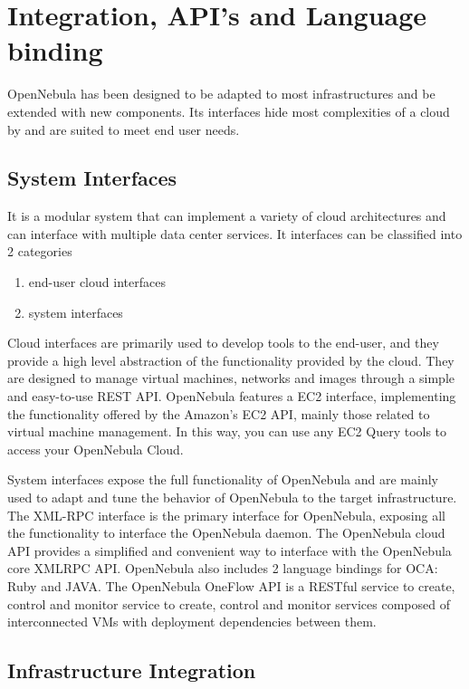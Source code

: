 \documentclass[9pt,twocolumn,twoside]{../../styles/osajnl}
\begin{document}
\section{Integration, API's and Language binding}

OpenNebula has been designed to be adapted to most 
infrastructures and be extended with new components. Its 
interfaces hide most complexities of a cloud by and are suited to meet 
end user needs.

\subsection{System Interfaces}
It is a modular system that can implement a variety of cloud 
architectures and can interface with multiple data center services. 
It interfaces can be classified into 2 categories

\begin{enumerate}
	\item end-user cloud interfaces
	\item system interfaces
\end{enumerate}

Cloud interfaces are primarily used to develop tools to the end-user, 
and they provide a high level abstraction of the functionality 
provided by the cloud. They are designed to manage virtual machines, 
networks and images through a simple and easy-to-use REST API. OpenNebula 
features a EC2 interface, implementing the functionality offered by the 
Amazon's EC2 API, mainly those related to virtual machine management. 
In this way, you can use any EC2 Query tools to access your OpenNebula 
Cloud.

{System interfaces}\cite{www-opennebula-systeminterfaces} expose the 
full functionality of OpenNebula and are 
mainly used to adapt and tune the behavior of OpenNebula to the 
target infrastructure. The XML-RPC interface is the primary interface 
for OpenNebula, exposing all the functionality to interface the 
OpenNebula daemon. The OpenNebula cloud API provides a simplified and 
convenient way to interface with the OpenNebula core XMLRPC API. 
OpenNebula also includes 2 language bindings for OCA: Ruby and JAVA. 
The OpenNebula OneFlow API is a RESTful service to create, control 
and monitor service to create, control and monitor services composed 
of interconnected VMs with deployment dependencies between them.

\subsection{Infrastructure Integration}
\end{document}
